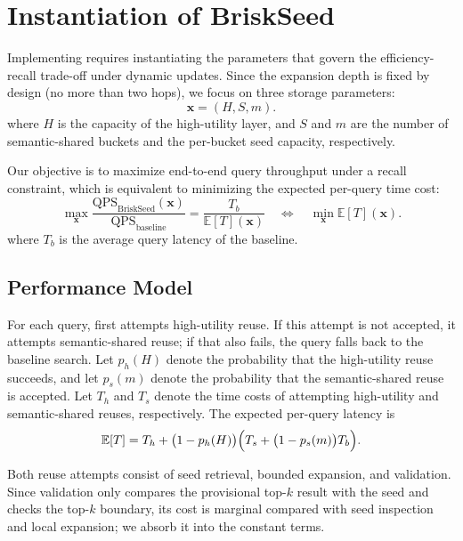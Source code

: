 \section{Instantiation of BriskSeed}
Implementing \system requires instantiating the parameters that govern the efficiency-recall trade-off under dynamic updates.
Since the expansion depth is fixed by design (no more than two hops), we focus on three storage parameters:
\begin{equation}
\mathbf{x}=(H,S,m).
\end{equation}
where $H$ is the capacity of the high-utility layer, and $S$ and $m$ are the number of semantic-shared buckets and the per-bucket seed capacity, respectively.

Our objective is to maximize end-to-end query throughput under a recall constraint, which is equivalent to minimizing the expected per-query time cost:
\begin{equation}
\max_{\mathbf{x}} \frac{\mathrm{QPS}_{\mathrm{BriskSeed}}(\mathbf{x})}{\mathrm{QPS}_{\mathrm{baseline}}}
=
\frac{T_b}{\mathbb{E}[T](\mathbf{x})}
\quad \Longleftrightarrow \quad
\min_{\mathbf{x}} \mathbb{E}[T](\mathbf{x}).
\end{equation}
where $T_b$ is the average query latency of the baseline.

\subsection{Performance Model}

For each query, \system first attempts high-utility reuse.
If this attempt is not accepted, it attempts semantic-shared reuse; if that also fails, the query falls back to the baseline search.
Let $p_h(H)$ denote the probability that the high-utility reuse succeeds, and let $p_s(m)$ denote the probability that the semantic-shared reuse is accepted.
Let $T_h$ and $T_s$ denote the time costs of attempting high-utility and semantic-shared reuses, respectively.
The expected per-query latency is
\begin{equation}
\mathbb{E}[T]
=
T_h
+
\bigl(1-p_h(H)\bigr)\Bigl(T_s+\bigl(1-p_s(m)\bigr)T_b\Bigr).
\label{eq:exp-latency}
\end{equation}

Both reuse attempts consist of seed retrieval, bounded expansion, and validation.
Since validation only compares the provisional top-$k$ result with the seed and checks the top-$k$ boundary, its cost is marginal compared with seed inspection and local expansion; we absorb it into the constant terms.




